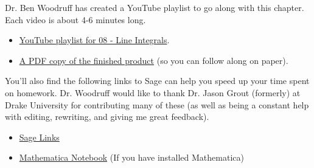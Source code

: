 \documentclass[10pt,]{book}
\theoremstyle{plain}
\theoremstyle{definition}
\theoremstyle{definition}
\theoremstyle{definition}
\theoremstyle{definition}
\theoremstyle{definition}
\numberwithin{equation}{section}
\begin{document}
Dr. Ben Woodruff has created a YouTube playlist to go along with this chapter. Each video is about 4-6 minutes long. \leavevmode%
\begin{itemize}[label=\textbullet]
\item{}\href{http://www.youtube.com/playlist?list=PL04DF68E73B7ECD54}{YouTube playlist for 08 - Line Integrals}.%
\item{}\href{http://db.tt/dAFBcMB7}{A PDF copy of the finished product} (so you can follow along on paper).%
\end{itemize}
%
\par
You'll also find the following links to Sage can help you speed up your time spent on homework. Dr. Woodruff would like to thank Dr. Jason Grout (formerly) at Drake University for contributing many of these (as well as being a constant help with editing, rewriting, and giving me great feedback). \leavevmode%
\begin{itemize}[label=\textbullet]
\item{}\href{http://bmw.byuimath.com/dokuwiki/doku.php?id=sage_links}{Sage Links}%
\item{}\href{https://content.byui.edu/file/3e8d885f-db47-4e74-9e04-c3d72627c835/1/_zips/215-Tech-Introduction.zip}{Mathematica Notebook} (If you have installed Mathematica)%
\end{itemize}
%
\typeout{************************************************}
\typeout{************************************************}
\end{document}
